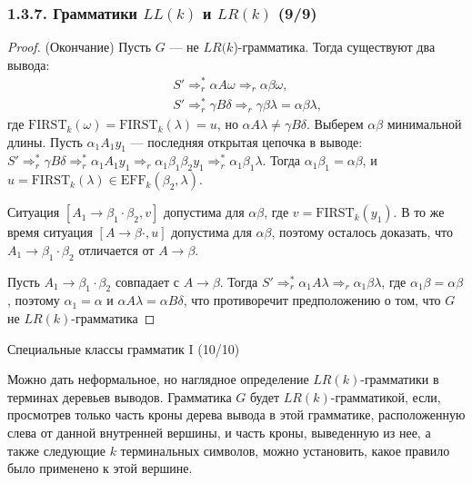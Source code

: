 \begin{frame}
\frametitle{1.3.7. Грамматики $LL(k)$ и $LR(k)$ (9/9)}
\begin{proof} (Окончание)
Пусть $G$ --- не $LR(k$)-грамматика.  
Тогда существуют два вывода:
\[
\begin{aligned}
\quad & S' \Rightarrow_r^* \alpha A \omega \Rightarrow_r \alpha \beta \omega,\\
\quad & S' \Rightarrow^*_{r} \gamma B \delta \Rightarrow_{r} \gamma \beta \lambda= \alpha \beta \lambda,
\end{aligned}
\]
где $\mathrm{FIRST}_k(\omega) = \mathrm{FIRST}_k(\lambda) = u$,
но $\alpha A \lambda \ne \gamma B \delta$.
Выберем $\alpha \beta$ минимальной длины.  
Пусть $\alpha_1 A_1 y_1$ — последняя открытая цепочка в выводе:
\(
S' \Rightarrow_r^* \gamma B \delta \Rightarrow_r^* \alpha_1 A_1 y_1
\Rightarrow_r \alpha_1 \beta_1 \beta_2 y_1 \Rightarrow_r^* \alpha_1 \beta_1 \lambda.
\)
Тогда $\alpha_1 \beta_1 = \alpha \beta$, и
$u = \mathrm{FIRST}_k(\lambda) \in \mathrm{EFF}_k(\beta_2, \lambda)$. 

Ситуация \([A_1 \to \beta_1 \cdot \beta_2, v]\) допустима для \(\alpha \beta\), где \(v = \mathrm{FIRST}_k(y_1)\).
В то же время ситуация \([A \to \beta \cdot , u]\) допустима для \(\alpha \beta\), поэтому осталось доказать, что \(A_1 \to \beta_1 \cdot \beta_2\) отличается от \(A \to \beta \). 

Пусть \(A_1 \to \beta_1 \cdot \beta_2\) совпадает с \(A \to \beta \). Тогда 
\(
S' \Rightarrow_r^*  \alpha_1 A \lambda
\Rightarrow_r \alpha_1 \beta \lambda
\), где \(\alpha_1 \beta = \alpha \beta \), поэтому \(\alpha_1 = \alpha\) и \(\alpha A \lambda = \alpha B \delta \), что противоречит предположению о том, что \(G\) не $LR(k)$-грамматика 
\end{proof}
\end{frame}

\begin{frame}{Специальные классы грамматик I (10/10)}
\begin{remark}
     Можно дать неформальное, но наглядное определение \(LR(k)\)-грамматики в терминах деревьев выводов. Грамматика \(G\) будет \(LR(k)\)-грамматикой, если, просмотрев только часть кроны дерева вывода в этой грамматике, расположенную слева от данной внутренней вершины, и часть кроны, выведенную из нее, а также следующие \(k\) терминальных символов, можно установить, какое правило было применено к этой вершине.
\end{remark}

 
\end{frame}

